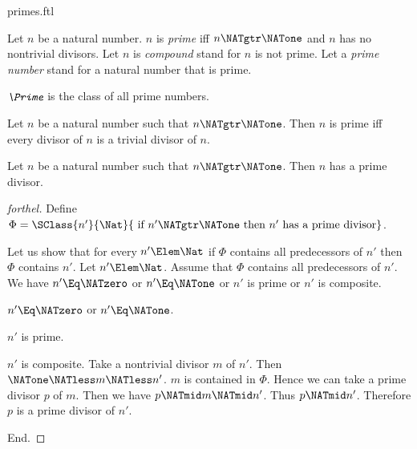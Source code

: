 \documentclass{stex}
\begin{document}
\begin{smodule}{primes.ftl}

\begin{definition}[forthel]
  Let $n$ be a natural number.
  $n$ is \emph{prime} iff $n \NATgtr \NATone$ and $n$ has no nontrivial divisors.
  Let $n$ is \emph{compound} stand for $n$ is not prime.
  Let a \emph{prime number} stand for a natural number that is prime.
\end{definition}

\begin{definition}[forthel]
  $\emph{\Prime}$ is the class of all prime numbers.
\end{definition}

\begin{proposition}[forthel]
  Let $n$ be a natural number such that $n \NATgtr \NATone$.
  Then $n$ is prime iff every divisor of $n$ is a trivial divisor of $n$.
\end{proposition}

\begin{proposition}[forthel]
  Let $n$ be a natural number such that $n \NATgtr \NATone$.
  Then $n$ has a prime divisor.
\end{proposition}
\begin{proof}[forthel]
  Define $\Phi = \SClass{n'}{\Nat}{\text{ if }n' \NATgtr \NATone\text{ then }n'\text{ has a prime divisor}}$.

  Let us show that for every $n' \Elem \Nat$ if $\Phi$ contains all
  predecessors of $n'$ then $\Phi$ contains $n'$.
    Let $n' \Elem \Nat$.
    Assume that $\Phi$ contains all predecessors of $n'$.
    We have $n' \Eq \NATzero$ or $n' \Eq \NATone$ or $n'$ is prime or $n'$ is composite.

    \begin{case}{$n' \Eq \NATzero$ or $n' \Eq \NATone$.} \end{case}

    \begin{case}{$n'$ is prime.} \end{case}

    \begin{case}{$n'$ is composite.}
      Take a nontrivial divisor $m$ of $n'$.
      Then $\NATone \NATless m \NATless n'$.
      $m$ is contained in $\Phi$.
      Hence we can take a prime divisor $p$ of $m$.
      Then we have $p \NATmid m \NATmid n'$.
      Thus $p \NATmid n'$.
      Therefore $p$ is a prime divisor of $n'$.
    \end{case}
  End.


\end{proof}
\end{smodule}
\end{document}
